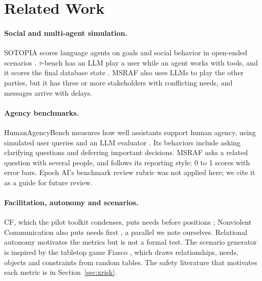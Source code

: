 \section{Related Work}

\paragraph{Social and multi-agent simulation.}
SOTOPIA scores language agents on goals and social behavior in open-ended scenarios \citep{zhou2024sotopia}.
$\tau$-bench has an LLM play a user while an agent works with tools, and it scores the final database state \citep{yao2024taubench}.
MSRAF also uses LLMs to play the other parties, but it has three or more stakeholders with conflicting needs, and messages arrive with delays.

\paragraph{Agency benchmarks.}
HumanAgencyBench measures how well assistants support human agency, using simulated user queries and an LLM evaluator \citep{sturgeon2025hab}.
Its behaviors include asking clarifying questions and deferring important decisions.
MSRAF asks a related question with several people, and follows its reporting style: 0 to 1 scores with error bars.
Epoch AI's benchmark review rubric \citep{epoch2026benchmarkreviews} was not applied here; we cite it as a guide for future review.

\paragraph{Facilitation, autonomy and scenarios.}
CF, which the pilot toolkit condenses, puts needs before positions \citep{kashtan2020hcd}; Nonviolent Communication also puts needs first \citep{rosenberg2015nvc}, a parallel we note ourselves.
Relational autonomy \citep{mackenzie2000relational} motivates the metrics but is not a formal test.
The scenario generator is inspired by the tabletop game Fiasco \citep{morningstar2009fiasco}, which draws relationships, needs, objects and constraints from random tables.
The safety literature that motivates each metric is in Section~\ref{sec:xrisk}.
